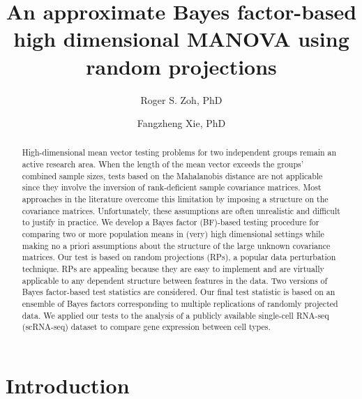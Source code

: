 \documentclass[alpha-refs]{wiley-article}
\title{An approximate Bayes factor-based high dimensional MANOVA using random projections}
\author[1\authfn{1}]{Roger S. Zoh, PhD}
\author[2\authfn{2}]{Fangzheng Xie, PhD}
\affil[1]{Department of Epidemiology \& Biostatistics, Indiana University, Bloomington, IN 47405, USA}
\affil[2]{Department of Statistics, Indiana University, Bloomington, IN 47408, USA}
\theoremstyle{plain}%
\theoremstyle{definition}
\begin{document}
\maketitle

\begin{abstract}
High-dimensional mean vector testing problems for two independent groups remain an active research area. When the length of the mean vector exceeds the groups’ combined sample sizes, tests based on the Mahalanobis distance are not applicable since they involve the inversion of rank-deficient sample covariance matrices. Most approaches in the literature overcome this limitation by imposing a structure on the covariance matrices. Unfortunately, these assumptions are often unrealistic and difficult to justify in practice. We develop a Bayes factor (BF)-based testing procedure for comparing two or more population means in (very) high dimensional settings while making no a priori assumptions about the structure of the large unknown covariance matrices. Our test is based on random projections (RPs), a popular data perturbation technique. RPs are appealing because they are easy to implement and
are virtually applicable to any dependent structure between features in the data. Two versions of Bayes factor-based test statistics are considered. Our final test statistic is based on an ensemble of Bayes factors corresponding to multiple replications of randomly projected data. We applied our tests to the analysis of a publicly available single-cell RNA-seq (scRNA-seq) dataset to compare gene expression between cell types.

\end{abstract}

\section{Introduction} \label{sec:intro}
\end{document}

